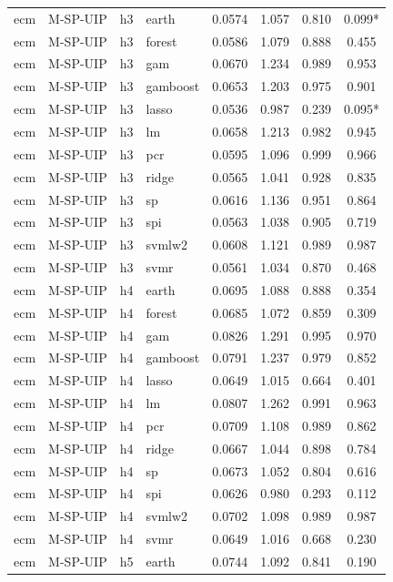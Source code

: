 \begin{ThreePartTable}
\begin{longtable}[t]{llclcccc}
\addlinespace
ecm & M-SP-UIP & h3 & earth & 0.0574 & 1.057 & 0.810 & 0.099*\\
ecm & M-SP-UIP & h3 & forest & 0.0586 & 1.079 & 0.888 & 0.455\\
ecm & M-SP-UIP & h3 & gam & 0.0670 & 1.234 & 0.989 & 0.953\\
ecm & M-SP-UIP & h3 & gamboost & 0.0653 & 1.203 & 0.975 & 0.901\\
ecm & M-SP-UIP & h3 & lasso & 0.0536 & 0.987 & 0.239 & 0.095*\\
ecm & M-SP-UIP & h3 & lm & 0.0658 & 1.213 & 0.982 & 0.945\\
ecm & M-SP-UIP & h3 & pcr & 0.0595 & 1.096 & 0.999 & 0.966\\
ecm & M-SP-UIP & h3 & ridge & 0.0565 & 1.041 & 0.928 & 0.835\\
ecm & M-SP-UIP & h3 & sp & 0.0616 & 1.136 & 0.951 & 0.864\\
ecm & M-SP-UIP & h3 & spi & 0.0563 & 1.038 & 0.905 & 0.719\\
ecm & M-SP-UIP & h3 & svmlw2 & 0.0608 & 1.121 & 0.989 & 0.987\\
ecm & M-SP-UIP & h3 & svmr & 0.0561 & 1.034 & 0.870 & 0.468\\
\addlinespace
ecm & M-SP-UIP & h4 & earth & 0.0695 & 1.088 & 0.888 & 0.354\\
ecm & M-SP-UIP & h4 & forest & 0.0685 & 1.072 & 0.859 & 0.309\\
ecm & M-SP-UIP & h4 & gam & 0.0826 & 1.291 & 0.995 & 0.970\\
ecm & M-SP-UIP & h4 & gamboost & 0.0791 & 1.237 & 0.979 & 0.852\\
ecm & M-SP-UIP & h4 & lasso & 0.0649 & 1.015 & 0.664 & 0.401\\
ecm & M-SP-UIP & h4 & lm & 0.0807 & 1.262 & 0.991 & 0.963\\
ecm & M-SP-UIP & h4 & pcr & 0.0709 & 1.108 & 0.989 & 0.862\\
ecm & M-SP-UIP & h4 & ridge & 0.0667 & 1.044 & 0.898 & 0.784\\
ecm & M-SP-UIP & h4 & sp & 0.0673 & 1.052 & 0.804 & 0.616\\
ecm & M-SP-UIP & h4 & spi & 0.0626 & 0.980 & 0.293 & 0.112\\
ecm & M-SP-UIP & h4 & svmlw2 & 0.0702 & 1.098 & 0.989 & 0.987\\
ecm & M-SP-UIP & h4 & svmr & 0.0649 & 1.016 & 0.668 & 0.230\\
\addlinespace
ecm & M-SP-UIP & h5 & earth & 0.0744 & 1.092 & 0.841 & 0.190\\

\end{longtable}
\end{ThreePartTable}
